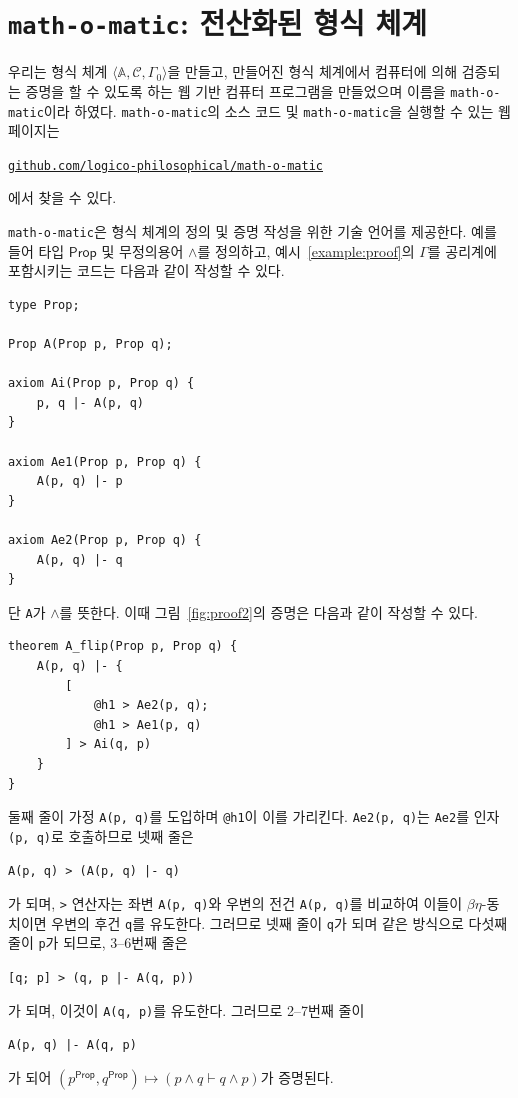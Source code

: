 \documentclass[10pt,twocolumn]{article}
\theoremstyle{definition}
\newcommand{\Prop}{\mathsf{Prop}}
\begin{document}
\section{\texttt{math-o-matic}: 전산화된 형식 체계}

우리는 형식 체계 $\langle\mathbb A, \mathcal C, \Gamma_0\rangle$을 만들고, 만들어진 형식 체계에서 컴퓨터에 의해 검증되는 증명을 할 수 있도록 하는 웹 기반 컴퓨터 프로그램을 만들었으며 이름을 \texttt{math-o-matic}이라 하였다. \texttt{math-o-matic}의 소스 코드 및 \texttt{math-o-matic}을 실행할 수 있는 웹 페이지는
\begin{center}
	\href{https://github.com/logico-philosophical/math-o-matic}{\texttt{github.com/logico-philosophical/math-o-matic}}
\end{center}
에서 찾을 수 있다.

\texttt{math-o-matic}은 형식 체계의 정의 및 증명 작성을 위한 기술 언어를 제공한다. 예를 들어 타입 $\Prop$ 및 무정의용어 $\land$를 정의하고, 예시~\ref{example:proof}의 $\Gamma$를 공리계에 포함시키는 코드는 다음과 같이 작성할 수 있다.

\begin{lstlisting}
type Prop;

Prop A(Prop p, Prop q);

axiom Ai(Prop p, Prop q) {
	p, q |- A(p, q)	
}

axiom Ae1(Prop p, Prop q) {
	A(p, q) |- p
}

axiom Ae2(Prop p, Prop q) {
	A(p, q) |- q	
}
\end{lstlisting}
단 \verb!A!가 $\land$를 뜻한다. 이때 그림~\ref{fig:proof2}의 증명은 다음과 같이 작성할 수 있다.
\begin{lstlisting}
theorem A_flip(Prop p, Prop q) {
	A(p, q) |- {
		[
			@h1 > Ae2(p, q);
			@h1 > Ae1(p, q)
		] > Ai(q, p)
	}
}
\end{lstlisting}
둘째 줄이 가정 \verb!A(p, q)!를 도입하며 \verb!@h1!이 이를 가리킨다. \verb!Ae2(p, q)!는 \verb!Ae2!를 인자 \verb!(p, q)!로 호출하므로 넷째 줄은
\begin{center}
	\verb!A(p, q) > (A(p, q) |- q)!
\end{center}
가 되며, \verb!>! 연산자는 좌변 \verb!A(p, q)!와 우변의 전건 \verb!A(p, q)!를 비교하여 이들이 $\beta\eta$-동치이면 우변의 후건 \verb!q!를 유도한다. 그러므로 넷째 줄이 \verb!q!가 되며 같은 방식으로 다섯째 줄이 \verb!p!가 되므로, 3--6번째 줄은
\begin{center}
	\verb![q; p] > (q, p |- A(q, p))!
\end{center}
가 되며, 이것이 \verb!A(q, p)!를 유도한다. 그러므로 2--7번째 줄이
\begin{center}
	\verb!A(p, q) |- A(q, p)!
\end{center}
가 되어 $(p^\Prop, q^\Prop)\mapsto (p\land q\vdash q\land p)$가 증명된다.
\end{document}
